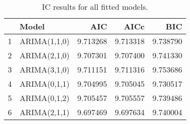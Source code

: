 \begin{table}[ht]
\centering
\begin{tabular}{rlrrr}
  \hline
 & Model & AIC & AICc & BIC \\ 
  \hline
1 & ARIMA(1,1,0) & 9.713268 & 9.713318 & 9.738790 \\ 
  2 & ARIMA(2,1,0) & 9.707301 & 9.707400 & 9.741330 \\ 
  3 & ARIMA(3,1,0) & 9.711151 & 9.711316 & 9.753686 \\ 
  4 & ARIMA(0,1,1) & 9.704995 & 9.705045 & 9.730517 \\ 
  5 & ARIMA(0,1,2) & 9.705457 & 9.705557 & 9.739486 \\ 
  6 & ARIMA(2,1,1) & 9.697469 & 9.697634 & 9.740004 \\ 
   \hline
\end{tabular}
\caption{IC results for all fitted models.}
\end{table}